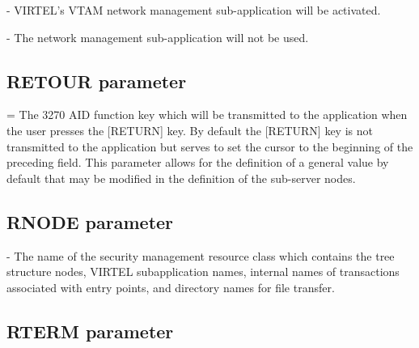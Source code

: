 \documentclass[letterpaper,10pt,english]{sphinxmanual}
\begin{document}
 - VIRTEL’s VTAM network management sub-application will be activated.

 - The network management sub-application will not be used.


\subsection{RETOUR parameter}
\label{\detokenize{Installation_Guide:index-108}}\label{\detokenize{Installation_Guide:retour-parameter}}
\begin{sphinxVerbatim}[commandchars=\\\{\}]
 
\end{sphinxVerbatim}

 = The 3270 AID function key which will be transmitted to the application when the user presses the {[}RETURN{]} key. By default the {[}RETURN{]} key is not transmitted to the application but serves to set the cursor to the beginning of the preceding field. This parameter allows for the definition of a general value by default that may be modified in the definition of the sub-server nodes.


\subsection{RNODE parameter}
\label{\detokenize{Installation_Guide:index-109}}\label{\detokenize{Installation_Guide:rnode-parameter}}
\begin{sphinxVerbatim}[commandchars=\\\{\}]
 
\end{sphinxVerbatim}

 - The name of the security management resource class which contains the tree structure nodes, VIRTEL subapplication names, internal names of transactions associated with entry points, and directory names for file transfer.


\subsection{RTERM parameter}
\label{\detokenize{Installation_Guide:rterm-parameter}}\label{\detokenize{Installation_Guide:index-110}}
\begin{sphinxVerbatim}[commandchars=\\\{\}]
\end{sphinxVerbatim}
\end{document}
